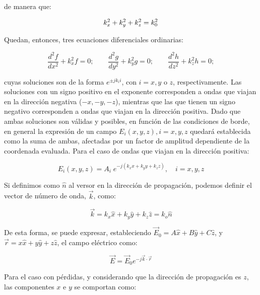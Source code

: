 de manera que:

\begin{equation}
	\label{eq:numero_de_onda}
	k_x^2 + k_y^2 + k_z^2 = k_0^2 \\
\end{equation}

Quedan, entonces, tres ecuaciones diferenciales ordinarias:

\begin{equation}
	\frac{d^2 f}{dx^2} + k_x^2 f = 0; \qquad \frac{d^2 g}{dy^2} + k_y^2 g = 0; \qquad \frac{d^2 h}{dz^2} + k_z^2 h = 0; \nonumber
\end{equation}

cuyas soluciones son de la forma $e^{\pm j k_i i}$, con $i = x, y$ o $z$, respectivamente. Las soluciones con un signo positivo en el exponente corresponden a ondas que viajan en la dirección negativa ($-x, -y, -z$), mientras que las que tienen un signo negativo corresponden a ondas que viajan en la dirección positiva. Dado que ambas soluciones son válidas y posibles, en función de las condiciones de borde, en general la expresión de un campo $E_i (x, y, z), i=x,y,z$ quedará establecida como la suma de ambas, afectadas por un factor de amplitud dependiente de la coordenada evaluada. Para el caso de ondas que viajan en la dirección positiva:

\begin{equation}
	E_i(x,y,z) = A_i \;e^{-j(k_x x + k_y y + k_z z)}, \quad i=x,y,z \nonumber
\end{equation}

Si definimos como $\hat{n}$ al versor en la dirección de propagación, podemos definir el vector de número de onda, $\vec{k}$, como:

\begin{equation}
	\label{eq:vector_numero_de_onda}
	\vec{k} = k_x \hat{x} + k_y \hat{y} + k_z \hat{z} = k_o \hat{n} \nonumber
\end{equation}

De esta forma, se puede expresar, estableciendo $\vec{E}_0 = A \hat{x} + B \hat{y} + C \hat{z}$, y $\vec{r} = x \hat{x} + y \hat{y} + z \hat{z}$, el campo eléctrico como:

\begin{equation}
	\label{eq:electric_field_wave_solution}
	\vec{E} = \vec{E}_0 e^{-j\vec{k} \cdot \vec{r}}
\end{equation}

Para el caso con pérdidas, y considerando que la dirección de propagación es $z$, las componentes $x$ e $y$ se comportan como:

